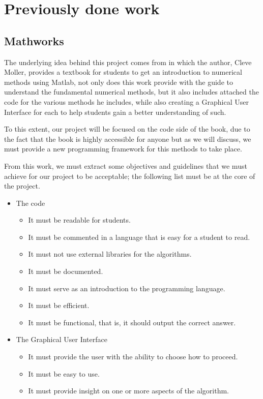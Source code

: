 \chapter{Previously done work}
\section{Mathworks}
The underlying idea behind this project comes from \cite{doi:10.1137/1.9780898717952} in which the author, Cleve Moller, provides a textbook for students to get an introduction to numerical methods using Matlab, not only does this work provide with the guide to understand the fundamental numerical methods, but it also includes attached the code for the various methods he includes, while also creating a Graphical User Interface for each to help students gain a better understanding of such.

To this extent, our project will be focused on the code side of the book, due to the fact that the book is highly accessible for anyone but as we will discuss, we must provide a new programming framework for this methods to take place.

From this work, we must extract some objectives and guidelines that we must achieve for our project to be acceptable; the following list must be at the core of the project.

\begin{itemize}
\item The code
    \begin{itemize}
        \item It must be readable for students.
        \item It must be commented in a language that is easy for a student to read.
        \item It must not use external libraries for the algorithms.
        \item It must be documented.
        \item It must serve as an introduction to the programming language.
        \item It must be efficient.
        \item It must be functional, that is, it should output the correct answer.
    \end{itemize}
\item The Graphical User Interface
    \begin{itemize}
        \item It must provide the user with the ability to choose how to proceed.
        \item It must be easy to use.
        \item It must provide insight on one or more aspects of the algorithm.
    \end{itemize}
\end{itemize}

